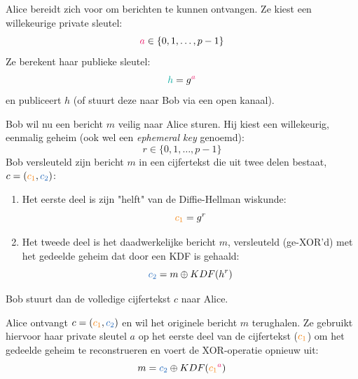 Alice bereidt zich voor om berichten te kunnen ontvangen. Ze kiest een willekeurige \textcolor{WildStrawberry}{private sleutel}:
\begin{equation*}
    \textcolor{WildStrawberry}{a} \in \{0, 1, \dots, p-1\}
\end{equation*}
Ze berekent haar \textcolor{Emerald}{publieke sleutel}:
\begin{equation*}
    \textcolor{Emerald}{h} = g^{\textcolor{WildStrawberry}{a}} 
\end{equation*}
en publiceert \textcolor{Emerald}{$h$} (of stuurt deze naar Bob via een open kanaal).


Bob wil nu een bericht $m$ veilig naar Alice sturen. Hij kiest een willekeurig, eenmalig geheim (ook wel een \emph{ephemeral key} genoemd):
\begin{equation*}
    r \in \{0, 1, \dots, p-1\}
\end{equation*}
Bob versleuteld zijn bericht $m$ in een cijfertekst die uit twee delen bestaat, $c = (\textcolor{BurntOrange}{c_1}, \textcolor{NavyBlue}{c_2})$:
\begin{enumerate}
    \item Het eerste deel is zijn "helft" van de Diffie-Hellman wiskunde:
    \begin{equation*}
        \textcolor{BurntOrange}{c_1} = g^r
    \end{equation*}
    \item Het tweede deel is het daadwerkelijke bericht $m$, versleuteld (ge-XOR'd) met het gedeelde geheim dat door een KDF is gehaald:
    \begin{equation*}
        \textcolor{NavyBlue}{c_2} = m \oplus KDF(h^r)
    \end{equation*} 
\end{enumerate}
Bob stuurt dan de volledige cijfertekst $c$ naar Alice.


Alice ontvangt $c = (\textcolor{BurntOrange}{c_1}, \textcolor{NavyBlue}{c_2})$ en wil het originele bericht $m$ terughalen. Ze gebruikt hiervoor haar \textcolor{WildStrawberry}{private sleutel $a$} op het eerste deel van de cijfertekst ($\textcolor{BurntOrange}{c_1}$) om het gedeelde geheim te reconstrueren en voert de XOR-operatie opnieuw uit:
\begin{equation*}
    m = \textcolor{NavyBlue}{c_2} \oplus KDF(\textcolor{BurntOrange}{c_1}^{\textcolor{WildStrawberry}{a}})
\end{equation*}

